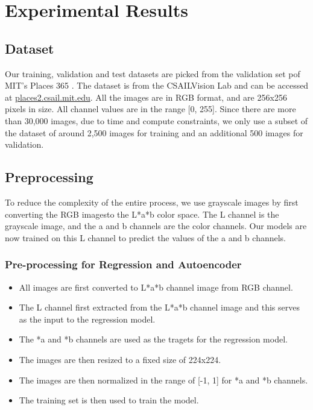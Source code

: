 \documentclass{article}
\begin{document}
\section{Experimental Results}

\subsection{Dataset}
Our training, validation and test datasets are picked from the validation set pof MIT's Places 365 \cite{7} . The dataset is from the CSAILVision Lab and can be accessed at \url{places2.csail.mit.edu}.
All the images are in RGB format, and are 256x256 pixels in size. All channel values are in the range [0, 255].
Since there are more than 30,000 images, due to time and compute constraints, we only use a subset of the dataset of around 2,500 images for training and an additional 500 images for validation.

\subsection{Preprocessing}
To reduce the complexity of the entire process, we use grayscale images by first converting the RGB imagesto the L*a*b color space.
The L channel is the grayscale image, and the a and b channels are the color channels.
Our models are now trained on this L channel to predict the values of the a and b channels.

\subsubsection{Pre-processing for Regression and Autoencoder}
\begin{itemize}
    \item All images are first converted to L*a*b channel image from RGB channel.
    \item The L channel first extracted from the L*a*b channel image and this serves as the input to the regression model.
    \item The *a and *b channels are used as the tragets for the regression model.
    \item The images are then resized to a fixed size of 224x224.
    \item The images are then normalized in the range of [-1, 1] for *a and *b channels.
    \item The training set is then used to train the model.
\end{itemize}
\end{document}
